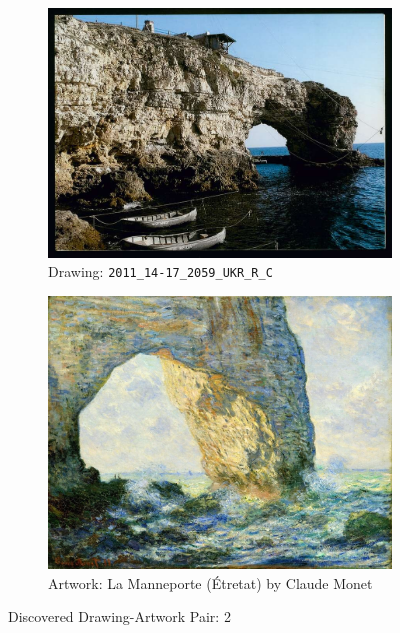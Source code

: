 \begin{figure}
     \centering
     \begin{subfigure}[b]{0.45\textwidth}
         \centering
         \includegraphics[width=\textwidth]{images/new_discoveries/2011_14-17_2059_UKR_R_C.jpg}
         \caption{Drawing: \texttt{2011\_14-17\_2059\_UKR\_R\_C}}
         \label{fig:2011_14-17_2059_UKR_R_C}
     \end{subfigure}
     \hfill
     \begin{subfigure}[b]{0.45\textwidth}
         \centering
         \includegraphics[width=\textwidth]{images/new_discoveries/Claude_Monet_23.jpg}
         \caption{Artwork: La Manneporte (Étretat) by Claude Monet}
         \label{fig:Claude_Monet_23}
     \end{subfigure}
     \caption{Discovered Drawing-Artwork Pair: 2}
\end{figure}



